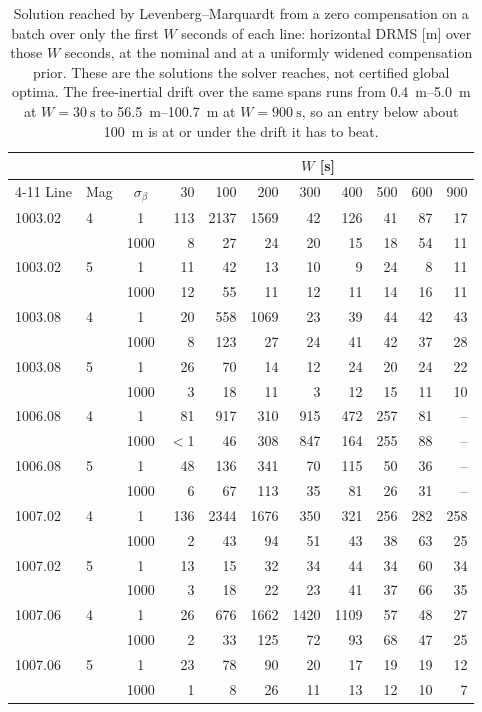 \begin{table}[t]
\caption{Solution reached by Levenberg--Marquardt from a zero compensation on a
batch over only the first $W$ seconds of each line: horizontal DRMS [m] over
those $W$ seconds, at the nominal and at a uniformly widened compensation prior.
These are the solutions the solver reaches, not certified global optima. The
free-inertial drift over the same spans runs from \SIrange{0.4}{5.0}{\meter} at
$W=\SI{30}{\second}$ to \SIrange{56.5}{100.7}{\meter} at $W=\SI{900}{\second}$,
so an entry below about \SI{100}{\meter} is at or under the drift it has to beat.}
\label{tab:knee}
\centering
\setlength{\tabcolsep}{3pt}
\begin{tabular}{ll c rrrrrrrr}
\toprule
 & & & \multicolumn{8}{c}{$W$ [s]} \\
\cmidrule(l){4-11}
Line & Mag & $\sigma_{\beta}$ & 30 & 100 & 200 & 300 & 400 & 500 & 600 & 900 \\
\midrule
1003.02 & 4 & 1 & 113 & 2137 & 1569 & 42 & 126 & 41 & 87 & 17 \\
        &   & 1000 & 8 & 27 & 24 & 20 & 15 & 18 & 54 & 11 \\
1003.02 & 5 & 1 & 11 & 42 & 13 & 10 & 9 & 24 & 8 & 11 \\
        &   & 1000 & 12 & 55 & 11 & 12 & 11 & 14 & 16 & 11 \\
1003.08 & 4 & 1 & 20 & 558 & 1069 & 23 & 39 & 44 & 42 & 43 \\
        &   & 1000 & 8 & 123 & 27 & 24 & 41 & 42 & 37 & 28 \\
1003.08 & 5 & 1 & 26 & 70 & 14 & 12 & 24 & 20 & 24 & 22 \\
        &   & 1000 & 3 & 18 & 11 & 3 & 12 & 15 & 11 & 10 \\
1006.08 & 4 & 1 & 81 & 917 & 310 & 915 & 472 & 257 & 81 & -- \\
        &   & 1000 & $<$1 & 46 & 308 & 847 & 164 & 255 & 88 & -- \\
1006.08 & 5 & 1 & 48 & 136 & 341 & 70 & 115 & 50 & 36 & -- \\
        &   & 1000 & 6 & 67 & 113 & 35 & 81 & 26 & 31 & -- \\
1007.02 & 4 & 1 & 136 & 2344 & 1676 & 350 & 321 & 256 & 282 & 258 \\
        &   & 1000 & 2 & 43 & 94 & 51 & 43 & 38 & 63 & 25 \\
1007.02 & 5 & 1 & 13 & 15 & 32 & 34 & 44 & 34 & 60 & 34 \\
        &   & 1000 & 3 & 18 & 22 & 23 & 41 & 37 & 66 & 35 \\
1007.06 & 4 & 1 & 26 & 676 & 1662 & 1420 & 1109 & 57 & 48 & 27 \\
        &   & 1000 & 2 & 33 & 125 & 72 & 93 & 68 & 47 & 25 \\
1007.06 & 5 & 1 & 23 & 78 & 90 & 20 & 17 & 19 & 19 & 12 \\
        &   & 1000 & 1 & 8 & 26 & 11 & 13 & 12 & 10 & 7 \\
\bottomrule
\end{tabular}
\end{table}
